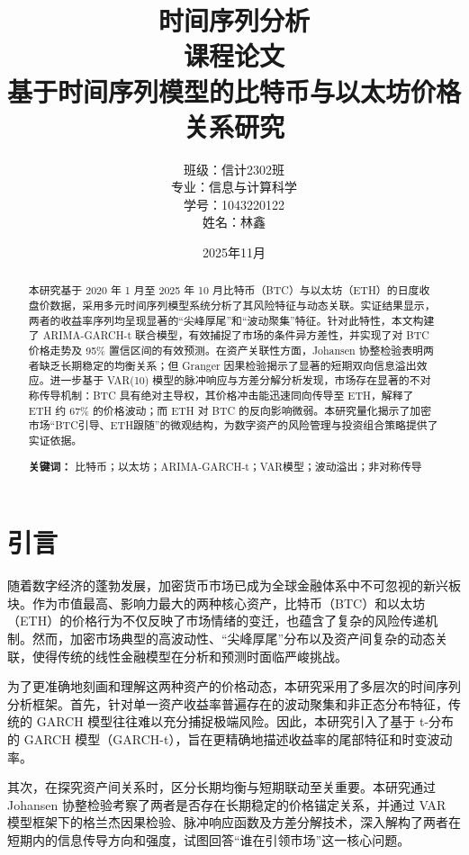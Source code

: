 \documentclass[a4paper]{ctexart}
\title{
	时间序列分析 \\
	课程论文 \\
	\vspace{1.5cm}
	\Huge 基于时间序列模型的比特币与以太坊价格关系研究
}
\author{
	班级：信计2302班 \\
	专业：信息与计算科学 \\
	学号：1043220122 \\
	姓名：林鑫
}
\date{2025年11月}
\begin{document}
	
	\maketitle
	\newpage
	
	\begin{abstract}
		\noindent 本研究基于 2020 年 1 月至 2025 年 10 月比特币（BTC）与以太坊（ETH）的日度收盘价数据，采用多元时间序列模型系统分析了其风险特征与动态关联。实证结果显示，两者的收益率序列均呈现显著的“尖峰厚尾”和“波动聚集”特征。针对此特性，本文构建了 ARIMA-GARCH-t 联合模型，有效捕捉了市场的条件异方差性，并实现了对 BTC 价格走势及 95\% 置信区间的有效预测。在资产关联性方面，Johansen 协整检验表明两者缺乏长期稳定的均衡关系；但 Granger 因果检验揭示了显著的短期双向信息溢出效应。进一步基于 VAR(10) 模型的脉冲响应与方差分解分析发现，市场存在显著的不对称传导机制：BTC 具有绝对主导权，其价格冲击能迅速同向传导至 ETH，解释了 ETH 约 67\% 的价格波动；而 ETH 对 BTC 的反向影响微弱。本研究量化揭示了加密市场“BTC引导、ETH跟随”的微观结构，为数字资产的风险管理与投资组合策略提供了实证依据。
		
		\vspace{1cm}
		\noindent \textbf{关键词：} 比特币；以太坊；ARIMA-GARCH-t；VAR模型；波动溢出；非对称传导
	\end{abstract}
	
	\newpage
	\tableofcontents %
	\newpage
	
	\section{引言}
	随着数字经济的蓬勃发展，加密货币市场已成为全球金融体系中不可忽视的新兴板块。作为市值最高、影响力最大的两种核心资产，比特币（BTC）和以太坊（ETH）的价格行为不仅反映了市场情绪的变迁，也蕴含了复杂的风险传递机制。然而，加密市场典型的高波动性、“尖峰厚尾”分布以及资产间复杂的动态关联，使得传统的线性金融模型在分析和预测时面临严峻挑战。
	
	为了更准确地刻画和理解这两种资产的价格动态，本研究采用了多层次的时间序列分析框架。首先，针对单一资产收益率普遍存在的波动聚集和非正态分布特征，传统的 GARCH 模型往往难以充分捕捉极端风险。因此，本研究引入了基于 t-分布的 GARCH 模型（GARCH-t），旨在更精确地描述收益率的尾部特征和时变波动率。
	
	其次，在探究资产间关系时，区分长期均衡与短期联动至关重要。本研究通过 Johansen 协整检验考察了两者是否存在长期稳定的价格锚定关系，并通过 VAR 模型框架下的格兰杰因果检验、脉冲响应函数及方差分解技术，深入解构了两者在短期内的信息传导方向和强度，试图回答“谁在引领市场”这一核心问题。
	
\end{document}

